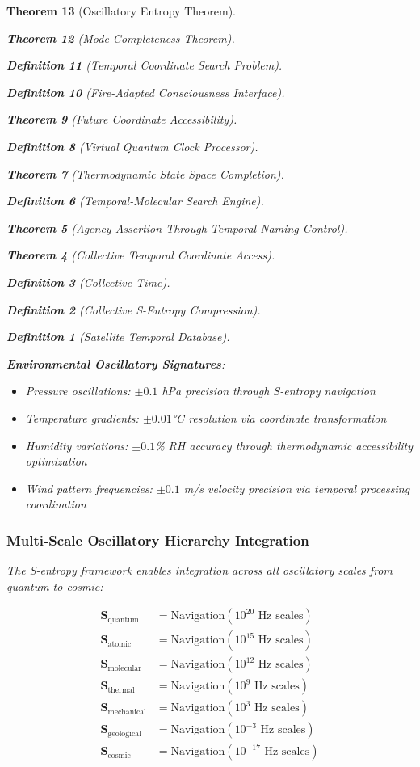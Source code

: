 \documentclass[12pt,a4paper]{article}
\newtheorem{theorem}{Theorem}[section]
\newtheorem{definition}[theorem]{Definition}
\begin{document}
\begin{theorem}[Oscillatory Entropy Theorem]
\begin{theorem}[Mode Completeness Theorem]
\begin{enumerate}
\begin{definition}[Temporal Coordinate Search Problem]
\begin{algorithm}
\begin{definition}[Fire-Adapted Consciousness Interface]
\begin{theorem}[Future Coordinate Accessibility]
\begin{definition}[Virtual Quantum Clock Processor]
\begin{itemize}
\begin{itemize}
\begin{theorem}[Thermodynamic State Space Completion]
\begin{definition}[Temporal-Molecular Search Engine]
\begin{theorem}[Agency Assertion Through Temporal Naming Control]
\begin{remark}
\begin{theorem}[Collective Temporal Coordinate Access]
\begin{definition}[Collective Time]
\begin{definition}[Collective S-Entropy Compression]
\begin{definition}[Satellite Temporal Database]
\begin{algorithm}
\begin{table}[h]
{{\textbf{Environmental Oscillatory Signatures}:
\begin{itemize}
\item Pressure oscillations: $\pm 0.1$ hPa precision through S-entropy navigation
\item Temperature gradients: $\pm 0.01$°C resolution via coordinate transformation
\item Humidity variations: $\pm 0.1$\% RH accuracy through thermodynamic accessibility optimization
\item Wind pattern frequencies: $\pm 0.1$ m/s velocity precision via temporal processing coordination
\end{itemize}

\subsubsection{Multi-Scale Oscillatory Hierarchy Integration}

The S-entropy framework enables integration across all oscillatory scales from quantum to cosmic:

\begin{align}
\mathbf{S}_{\text{quantum}} &= \text{Navigation}(10^{20} \text{ Hz scales}) \\
\mathbf{S}_{\text{atomic}} &= \text{Navigation}(10^{15} \text{ Hz scales}) \\
\mathbf{S}_{\text{molecular}} &= \text{Navigation}(10^{12} \text{ Hz scales}) \\
\mathbf{S}_{\text{thermal}} &= \text{Navigation}(10^{9} \text{ Hz scales}) \\
\mathbf{S}_{\text{mechanical}} &= \text{Navigation}(10^{3} \text{ Hz scales}) \\
\mathbf{S}_{\text{geological}} &= \text{Navigation}(10^{-3} \text{ Hz scales}) \\
\mathbf{S}_{\text{cosmic}} &= \text{Navigation}(10^{-17} \text{ Hz scales})
\end{align}

}}
\end{table}
\end{algorithm}
\end{definition}
\end{definition}
\end{definition}
\end{theorem}
\end{remark}
\end{theorem}
\end{definition}
\end{theorem}
\end{itemize}
\end{itemize}
\end{definition}
\end{theorem}
\end{definition}
\end{algorithm}
\end{definition}
\end{enumerate}
\end{theorem}
\end{theorem}
\end{document}
